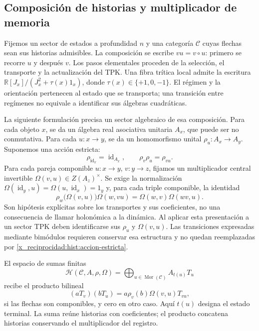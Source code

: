 \subsection{Composición de historias y multiplicador de memoria}
\label{x_reciprocidad:hist:algebra}

Fijemos un sector de estados a profundidad \(n\) y una categoría
\(\mathcal C\) cuyas flechas sean sus historias admisibles. La composición
se escribe \(vu=v\circ u\): primero se recorre \(u\) y después \(v\).
Los pasos elementales proceden de la selección, el transporte y la
actualización del TPK. Una fibra trítica local admite la escritura
\(\mathbb R[J_x]/(J_x^2+\tau(x)1_x)\), donde
\(\tau(x)\in\{+1,0,-1\}\). El régimen y la orientación pertenecen al
estado que se transporta; una transición entre regímenes no equivale a
identificar sus álgebras cuadráticas.

La siguiente formulación precisa un sector algebraico de esa composición.
Para cada objeto \(x\), se da un álgebra real asociativa unitaria \(A_x\),
que puede ser no conmutativa. Para cada \(u:x\to y\), se da un
homomorfismo unital \(\rho_u:A_x\to A_y\). Suponemos una acción estricta:
\begin{equation}
 \rho_{\operatorname{id}_x}=\operatorname{id}_{A_x},\qquad
 \rho_v\rho_u=\rho_{vu}.
 \label{x_reciprocidad:hist:accion-estricta}
\end{equation}
Para cada pareja componible \(u:x\to y\), \(v:y\to z\), fijamos un
multiplicador central invertible
\(\Omega(v,u)\in Z(A_z)^\times\). Se exige la normalización
\(\Omega(\operatorname{id}_y,u)=\Omega(u,\operatorname{id}_x)=1_y\)
y, para cada triple componible, la identidad
\begin{equation}
 \rho_w\bigl(\Omega(v,u)\bigr)\Omega(w,vu)
   =\Omega(w,v)\Omega(wv,u).
 \label{x_reciprocidad:hist:cociclo}
\end{equation}
Son hipótesis explícitas sobre los transportes y sus coeficientes, no una
consecuencia de llamar holonómica a la dinámica. Al aplicar esta presentación
a un sector TPK deben identificarse sus \(\rho_u\) y \(\Omega(v,u)\).
Las transiciones expresadas mediante bimódulos requieren conservar esa
estructura y no quedan reemplazadas por \eqref{x_reciprocidad:hist:accion-estricta}.

El espacio de sumas finitas
\[
 \mathcal H(\mathcal C,A,\rho,\Omega)
   =\bigoplus_{u\in\operatorname{Mor}(\mathcal C)} A_{t(u)}T_u
\]
recibe el producto bilineal
\begin{equation}
 (aT_v)(bT_u)=a\rho_v(b)\Omega(v,u)T_{vu},
 \label{x_reciprocidad:hist:producto}
\end{equation}
si las flechas son componibles, y cero en otro caso. Aquí \(t(u)\)
designa el estado terminal. La suma reúne historias con coeficientes; el
producto concatena historias conservando el multiplicador del registro.

